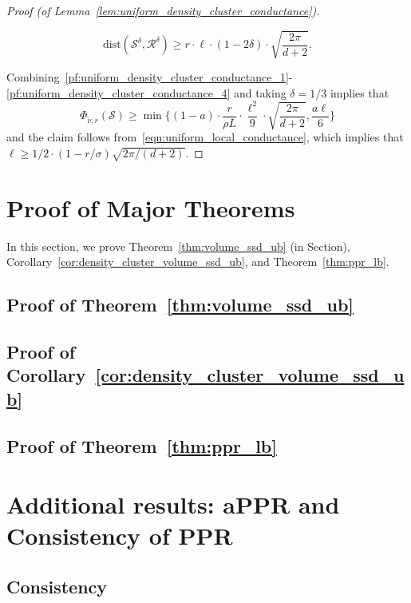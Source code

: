 \documentclass{article}
\newcommand{\1}{\mathbf{1}}
\newcommand{\mc}[1]{\mathcal{#1}}
\newcommand{\wt}[1]{\widetilde{#1}}
\theoremstyle{definition}
\theoremstyle{remark}
\begin{document}
\begin{proof}[Proof (of Lemma~\ref{lem:uniform_density_cluster_conductance})]
\begin{itemize}
\begin{equation}
		\mathrm{dist}(\mc{S}^{\delta},\mc{R}^{\delta}) \geq r \cdot \ell \cdot (1 - 2\delta) \cdot \sqrt{\frac{2\pi}{d + 2}}.
		\end{equation}
	\end{itemize}	
	Combining~\eqref{pf:uniform_density_cluster_conductance_1}-\eqref{pf:uniform_density_cluster_conductance_4} and taking $\delta = 1/3$ implies that
	\begin{equation*}
	\Phi_{\wt{\nu},r}(\mc{S}) \geq \min\biggl\{(1 - a) \cdot \frac{r}{\rho L} \cdot \frac{\ell^2}{9} \cdot \sqrt{\frac{2\pi}{d + 2}}, \frac{a\ell}{6}\biggr\}
	\end{equation*}
	and the claim follows from~\eqref{eqn:uniform_local_conductance}, which implies that $\ell \geq 1/2 \cdot (1 - r/\sigma)\sqrt{2\pi/(d + 2)}$.
\end{proof}


\section{Proof of Major Theorems}
\label{sec:pf_major_theorems}
In this section, we prove Theorem~\ref{thm:volume_ssd_ub} (in Section), Corollary~\ref{cor:density_cluster_volume_ssd_ub}, and Theorem~\ref{thm:ppr_lb}.

\subsection{Proof of Theorem~\ref{thm:volume_ssd_ub}}

\subsection{Proof of Corollary~\ref{cor:density_cluster_volume_ssd_ub}}

\subsection{Proof of Theorem~\ref{thm:ppr_lb}}




\section{Additional results: aPPR and Consistency of PPR}
\label{sec:appr_misclassification_error}

\subsection{Consistency}
\label{subsec:consistent_recovery_density_clusters}
\end{document}
